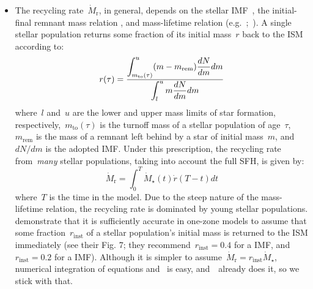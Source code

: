 \documentclass[ms.tex]{subfiles}
\begin{document}
\begin{itemize}
\begin{itemize}
		\item The recycling rate~$\dot{M}_\text{r}$, in general, depends on the
		stellar IMF~\citep[e.g.][]{Salpeter1955, Miller1979, Kroupa2001,
		Chabrier2003}, the initial-final remnant mass relation
		\citep[e.g.][]{Kalirai2008}, and mass-lifetime relation
		(e.g.~\citealp{Larson1974, Maeder1989};~\citealp*{Hurley2000}).
		A single stellar population returns some fraction of its initial
		mass~$r$ back to the ISM according to:
		\begin{equation}
		\label{eq:crf}
		r(\tau) = \frac{\displaystyle{
			\int_{m_\text{to}(\tau)}^u (m - m_\text{rem})\frac{dN}{dm} dm
		}}{\displaystyle{
			\int_l^u m \frac{dN}{dm} dm
		}}
		\end{equation}
		where~$l$ and~$u$ are the lower and upper mass limits of star formation,
		respectively,~$m_\text{to}(\tau)$ is the turnoff mass of a stellar
		population of age~$\tau$,~$m_\text{rem}$ is the mass of a remnant left
		behind by a star of initial mass~$m$, and~$dN/dm$ is the adopted IMF.
		Under this prescription, the recycling rate from~\textit{many} stellar
		populations, taking into account the full SFH, is given by:
		\begin{equation}
		\label{eq:mdot_recycled}
		\dot{M}_\text{r} = \int_0^T \dot{M}_\star(t) \dot{r}(T - t) dt
		\end{equation}
		where~$T$ is the time in the model.
		Due to the steep nature of the mass-lifetime relation, the recycling
		rate is dominated by young stellar populations.
		\citet{Weinberg2017} demonstrate that it is sufficiently accurate in
		one-zone models to assume that some fraction~$r_\text{inst}$ of a
		stellar population's initial mass is returned to the ISM immediately
		(see their Fig. 7; they recommend~$r_\text{inst} = 0.4$ for a
		\citealt{Kroupa2001} IMF, and~$r_\text{inst} = 0.2$ for a
		\citealt{Salpeter1955} IMF).
		Although it is simpler to assume~$\dot{M}_\text{r} =
		r_\text{inst}\dot{M}_\star$, numerical integration of equations
		 and~ is easy, and~\vice~already
		does it, so we stick with that.


\end{itemize}
\end{itemize}
\end{document}
